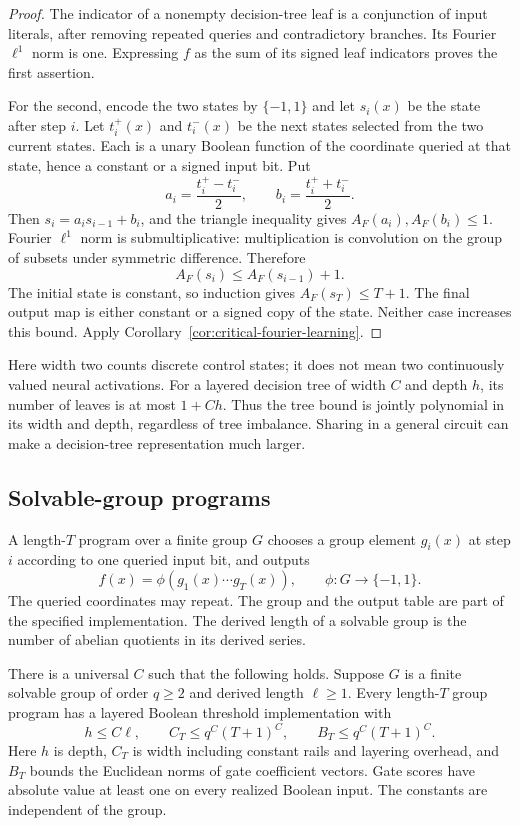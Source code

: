 \begin{proof}
The indicator of a nonempty decision-tree leaf is a conjunction of input
literals, after removing repeated queries and contradictory branches.
Its Fourier $\ell^1$ norm is one. Expressing $f$ as the sum of its signed
leaf indicators proves the first assertion.

For the second, encode the two states by $\{-1,1\}$ and let $s_i(x)$
be the state after step $i$. Let $t_i^+(x)$ and $t_i^-(x)$ be the next
states selected from the two current states. Each is a unary Boolean
function of the coordinate queried at that state, hence a constant or a
signed input bit. Put
\[
 a_i=\frac{t_i^+-t_i^-}{2},\qquad
 b_i=\frac{t_i^++t_i^-}{2}.
\]
Then $s_i=a_is_{i-1}+b_i$, and the triangle inequality gives
$A_F(a_i),A_F(b_i)\le1$.
Fourier $\ell^1$ norm is submultiplicative: multiplication is convolution
on the group of subsets under symmetric difference. Therefore
\[
 A_F(s_i)\le A_F(s_{i-1})+1.
\]
The initial state is constant, so induction gives $A_F(s_T)\le T+1$.
The final output map is either constant or a signed copy of the state.
Neither case increases this bound. Apply
Corollary~\ref{cor:critical-fourier-learning}.
\end{proof}

Here width two counts discrete control states; it does not mean two
continuously valued neural activations. For a layered decision tree of
width $C$ and depth $h$, its number of leaves is at most $1+Ch$.
Thus the tree bound is jointly polynomial in its width and depth,
regardless of tree imbalance. Sharing in a general circuit can make a
decision-tree representation much larger.

\subsection{Solvable-group programs}

A length-$T$ program over a finite group $G$ chooses a group element
$g_i(x)$ at step $i$ according to one queried input bit, and outputs
\[
 f(x)=\phi(g_1(x)\cdots g_T(x)),\qquad
 \phi:G\longrightarrow\{-1,1\}.
\]
The queried coordinates may repeat. The group and the output table are
part of the specified implementation. The derived length of a solvable
group is the number of abelian quotients in its derived series.

\begin{lemma}
\label{lem:critical-solvable-group-compiler}
There is a universal $C$ such that the following holds. Suppose $G$ is
a finite solvable group of order $q\ge2$ and derived length $\ell\ge1$.
Every length-$T$ group program has a layered Boolean threshold
implementation with
\[
 h\le C\ell,\qquad
 C_T\le q^C(T+1)^C,\qquad
 B_T\le q^C(T+1)^C.
\]
Here $h$ is depth, $C_T$ is width including constant rails and layering
overhead, and $B_T$ bounds the Euclidean norms of gate coefficient
vectors. Gate scores have absolute value at least one on every
realized Boolean input. The constants are independent of the group.
\end{lemma}

